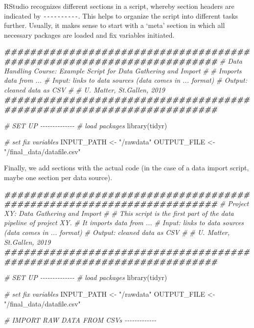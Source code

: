 \documentclass[
  12pt,
]{style/krantz}
\newenvironment{Shaded}{\begin{snugshade}}{\end{snugshade}}
\newcommand{\CommentTok}[1]{\textcolor[rgb]{0.56,0.35,0.01}{\textit{#1}}}
\newcommand{\DocumentationTok}[1]{\textcolor[rgb]{0.56,0.35,0.01}{\textbf{\textit{#1}}}}
\newcommand{\FunctionTok}[1]{\textcolor[rgb]{0.00,0.00,0.00}{#1}}
\newcommand{\NormalTok}[1]{#1}
\newcommand{\OtherTok}[1]{\textcolor[rgb]{0.56,0.35,0.01}{#1}}
\newcommand{\StringTok}[1]{\textcolor[rgb]{0.31,0.60,0.02}{#1}}
\begin{document}
RStudio recognizes different sections in a script, whereby section headers are indicated by \texttt{-\/-\/-\/-\/-\/-\/-\/-\/-\/-}. This helps to organize the script into different tasks further. Usually, it makes sense to start with a `meta' section in which all necessary packages are loaded and fix variables initiated.

\begin{Shaded}
\begin{Highlighting}[]
\DocumentationTok{\#\#\#\#\#\#\#\#\#\#\#\#\#\#\#\#\#\#\#\#\#\#\#\#\#\#\#\#\#\#\#\#\#\#\#\#\#\#\#\#\#\#\#\#\#\#\#\#\#\#\#\#\#\#\#\#\#\#\#\#\#\#\#\#\#\#\#\#\#\#\#}
\CommentTok{\# Data Handling Course: Example Script for Data Gathering and Import}
\CommentTok{\#}
\CommentTok{\# Imports data from ...}
\CommentTok{\# Input: links to data sources (data comes in ... format)}
\CommentTok{\# Output: cleaned data as CSV}
\CommentTok{\#}
\CommentTok{\# U. Matter, St.Gallen, 2019}
\DocumentationTok{\#\#\#\#\#\#\#\#\#\#\#\#\#\#\#\#\#\#\#\#\#\#\#\#\#\#\#\#\#\#\#\#\#\#\#\#\#\#\#\#\#\#\#\#\#\#\#\#\#\#\#\#\#\#\#\#\#\#\#\#\#\#\#\#\#\#\#\#\#\#\#}


\CommentTok{\# SET UP {-}{-}{-}{-}{-}{-}{-}{-}{-}{-}{-}{-}{-}{-}}
\CommentTok{\# load packages}
\FunctionTok{library}\NormalTok{(tidyr)}

\CommentTok{\# set fix variables}
\NormalTok{INPUT\_PATH }\OtherTok{\textless{}{-}} \StringTok{"/rawdata"}
\NormalTok{OUTPUT\_FILE }\OtherTok{\textless{}{-}} \StringTok{"/final\_data/datafile.csv"}
\end{Highlighting}
\end{Shaded}

Finally, we add sections with the actual code (in the case of a data import script, maybe one section per data source).

\begin{Shaded}
\begin{Highlighting}[]
\DocumentationTok{\#\#\#\#\#\#\#\#\#\#\#\#\#\#\#\#\#\#\#\#\#\#\#\#\#\#\#\#\#\#\#\#\#\#\#\#\#\#\#\#\#\#\#\#\#\#\#\#\#\#\#\#\#\#\#\#\#\#\#\#\#\#\#\#\#\#\#\#\#\#\#}
\CommentTok{\# Project XY: Data Gathering and Import}
\CommentTok{\#}
\CommentTok{\# This script is the first part of the data pipeline of project XY.}
\CommentTok{\# It imports data from ...}
\CommentTok{\# Input: links to data sources (data comes in ... format)}
\CommentTok{\# Output: cleaned data as CSV}
\CommentTok{\#}
\CommentTok{\# U. Matter, St.Gallen, 2019}
\DocumentationTok{\#\#\#\#\#\#\#\#\#\#\#\#\#\#\#\#\#\#\#\#\#\#\#\#\#\#\#\#\#\#\#\#\#\#\#\#\#\#\#\#\#\#\#\#\#\#\#\#\#\#\#\#\#\#\#\#\#\#\#\#\#\#\#\#\#\#\#\#\#\#\#}


\CommentTok{\# SET UP {-}{-}{-}{-}{-}{-}{-}{-}{-}{-}{-}{-}{-}{-}}
\CommentTok{\# load packages}
\FunctionTok{library}\NormalTok{(tidyr)}

\CommentTok{\# set fix variables}
\NormalTok{INPUT\_PATH }\OtherTok{\textless{}{-}} \StringTok{"/rawdata"}
\NormalTok{OUTPUT\_FILE }\OtherTok{\textless{}{-}} \StringTok{"/final\_data/datafile.csv"}


\CommentTok{\# IMPORT RAW DATA FROM CSVs {-}{-}{-}{-}{-}{-}{-}{-}{-}{-}{-}{-}{-}}
\end{Highlighting}
\end{Shaded}
\end{document}
